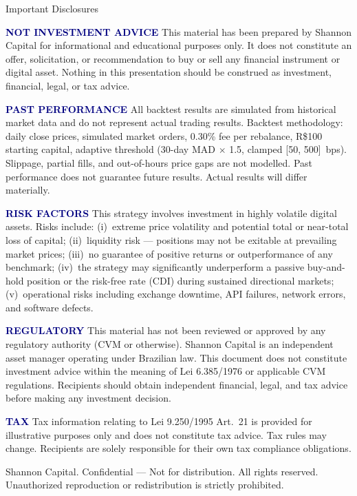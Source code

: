 \documentclass[aspectratio=169,10pt]{beamer}
\begin{document}
\begin{frame}[allowframebreaks]{Important Disclosures}
\scriptsize
\color{BodyText}
\setlength{\parskip}{0.5em}

\textcolor{Navy}{\textbf{NOT INVESTMENT ADVICE}} \quad
This material has been prepared by Shannon Capital for informational and educational
purposes only. It does not constitute an offer, solicitation, or recommendation to buy
or sell any financial instrument or digital asset. Nothing in this presentation should
be construed as investment, financial, legal, or tax advice.

\textcolor{Navy}{\textbf{PAST PERFORMANCE}} \quad
All backtest results are simulated from historical market data and do not represent
actual trading results. Backtest methodology: daily close prices, simulated market
orders, 0.30\% fee per rebalance, R\$100 starting capital, adaptive threshold
(30-day MAD $\times$ 1.5, clamped [50, 500]~bps). Slippage, partial fills, and
out-of-hours price gaps are not modelled. Past performance does not guarantee future
results. Actual results will differ materially.

\textcolor{Navy}{\textbf{RISK FACTORS}} \quad
This strategy involves investment in highly volatile digital assets. Risks include:
(i)~extreme price volatility and potential total or near-total loss of capital;
(ii)~liquidity risk --- positions may not be exitable at prevailing market prices;
(iii)~no guarantee of positive returns or outperformance of any benchmark;
(iv)~the strategy may significantly underperform a passive buy-and-hold position or
the risk-free rate (CDI) during sustained directional markets;
(v)~operational risks including exchange downtime, API failures, network errors,
and software defects.

\textcolor{Navy}{\textbf{REGULATORY}} \quad
This material has not been reviewed or approved by any regulatory authority
(CVM or otherwise). Shannon Capital is an independent asset manager operating under
Brazilian law. This document does not constitute investment advice within the meaning
of Lei 6.385/1976 or applicable CVM regulations. Recipients should obtain independent
financial, legal, and tax advice before making any investment decision.

\textcolor{Navy}{\textbf{TAX}} \quad
Tax information relating to Lei 9.250/1995 Art.~21 is provided for illustrative
purposes only and does not constitute tax advice. Tax rules may change. Recipients
are solely responsible for their own tax compliance obligations.

\vspace{0.3em}
{\color{MutedText}\textcopyright{} Shannon Capital. Confidential ---
Not for distribution. All rights reserved. Unauthorized reproduction or
redistribution is strictly prohibited.}

\end{frame}
\end{document}
